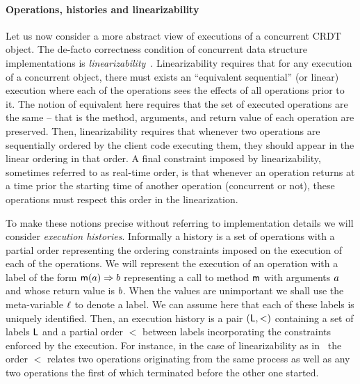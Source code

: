 
\paragraph{Operations, histories and linearizability}
Let us now consider a more abstract view of executions of a concurrent
CRDT object.
%
The de-facto correctness condition of concurrent data structure
implementations is \emph{linearizability}~\cite{HerlihyW90}.
%
Linearizability requires that for any execution of a concurrent
object, there must exists an ``equivalent sequential'' (or linear)
execution where each of the operations sees the effects of all
operations prior to it.
%
The notion of equivalent here requires that the set of executed
operations are the same -- that is the method, arguments, and return
value of each operation are preserved.
%
Then, linearizability requires that whenever two operations are
sequentially ordered by the client code executing them, they should
appear in the linear ordering in that order.
%
A final constraint imposed by linearizability, sometimes referred to
as real-time order, is that whenever an operation returns at a time
prior the starting time of another operation (concurrent or not),
these operations must respect this order in the linearization.
%

To make these notions precise without referring to implementation
details we will consider \emph{execution histories}.
%
Informally a history is a set of operations with a partial order
representing the ordering constraints imposed on the execution of each
of the operations.
%
We will represent the execution of an operation with a label of the
form $\mathsf{m}(a) \Rightarrow b$ representing a call to method
$\mathsf{m}$ with arguments $a$ and whose return value is $b$.
%
When the values are unimportant we shall use the meta-variable
$\ell$ to denote a label.
%
We can assume here that each of these labels is uniquely identified.
%
Then, an execution history is a pair $(\mathsf{L}, <)$ containing a
set of labels $\mathsf{L}$ and a partial order $<$ between labels
incorporating the constraints enforced by the execution.
%
For instance, in the case of linearizability as in~\cite{HerlihyW90}
the order $<$ relates two operations originating from the same process
as well as any two operations the first of which terminated before the
other one started.
%

